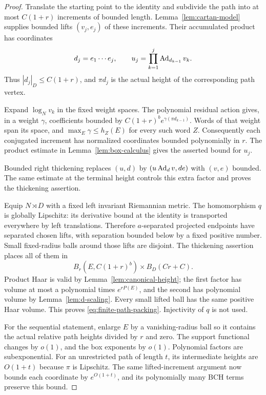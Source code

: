 \begin{proof}
Translate the starting point to the identity and subdivide the
path into at most $C(1+r)$ increments of bounded length.
Lemma~\ref{lem:cartan-model} supplies bounded lifts $(v_j,e_j)$ of
these increments. Their accumulated product has coordinates
\[
 d_j=e_1\cdots e_j,
 \qquad
 u_j=\prod_{k=1}^j\operatorname{Ad}_{d_{k-1}}v_k.
\]
Thus $|d_j|_D\le C(1+r)$, and $\pi d_j$ is the actual height of
the corresponding path vertex.

Expand $\log_Nv_k$ in the fixed weight spaces. The polynomial
residual action gives, in a weight $\gamma$, coefficients bounded
by $C(1+r)^b e^{\gamma(\pi d_{k-1})}$. Words of that weight span
its space, and
$\max_E\gamma\le h_Z(E)$ for every such word $Z$.
Consequently each conjugated increment has normalized coordinates
bounded polynomially in $r$. The product estimate in
Lemma~\ref{lem:box-calculus} gives the asserted bound for $u_j$.

Bounded right thickening replaces $(u,d)$ by
$(u\operatorname{Ad}_dv,de)$ with $(v,e)$ bounded. The same estimate at the
terminal height controls this extra factor and proves the
thickening assertion.

Equip $N\rtimes D$ with a fixed left invariant Riemannian metric.
The homomorphism $q$ is globally Lipschitz: its derivative bound at
the identity is transported everywhere by left translations.
Therefore $a$-separated projected endpoints have separated chosen
lifts, with separation bounded below by a fixed positive number.
Small fixed-radius balls around those lifts are disjoint.
The thickening assertion places all of them in
\[
 B_r(E,C(1+r)^b)\times B_D(Cr+C).
\]
Product Haar is valid by Lemma~\ref{lem:canonical-height}; the first
factor has volume at most a polynomial times $e^{rP(E)}$, and the
second has polynomial volume by Lemma~\ref{lem:d-scaling}.
Every small lifted ball has the same positive Haar volume.
This proves \eqref{eq:finite-path-packing}. Injectivity of $q$ is
not used.

For the sequential statement, enlarge $E$ by a vanishing-radius
ball so it contains the actual relative path heights divided by
$r$ and zero. The support functional changes by $o(1)$, and the
box exponents by $o(1)$. Polynomial factors are subexponential.
For an unrestricted path of length $t$, its intermediate heights
are $O(1+t)$ because $\pi$ is Lipschitz. The same lifted-increment
argument now bounds each coordinate by $e^{O(1+t)}$, and its
polynomially many BCH terms preserve this bound.
\end{proof}

